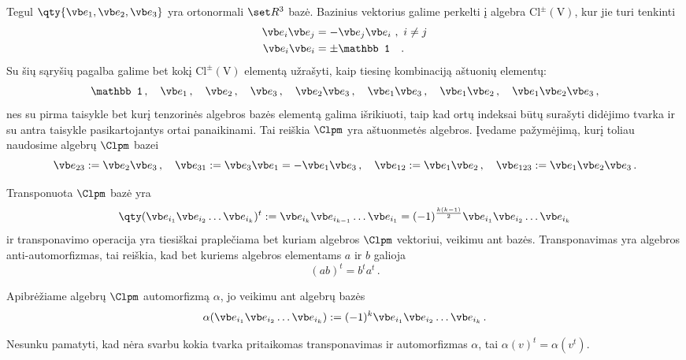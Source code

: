 Tegul $\qty{\vb e_1,\vb e_2,\vb e_3}$ yra ortonormali $\set R^3$ bazė.
Bazinius vektorius galime perkelti į algebra $\mathup{Cl^\pm(V)}$,
kur jie turi tenkinti
\begin{equation}
	\begin{split}
		\vb e_i \vb e_j &= - \vb e_j \vb e_i \ , \ i \neq j \\
		\vb e_i \vb e_i &= \pm \mathbb 1
		\quad .
	\end{split}
	\label{eq:base-relations}
\end{equation}
Su šių sąryšių pagalba galime bet kokį $\mathup{Cl^\pm(V)}$ elementą užrašyti,
kaip tiesinę kombinaciją aštuonių elementų:
\begin{equation}
	\mathbb 1 \,,\quad
	\vb e_1 \,,\quad 
	\vb e_2 \,,\quad  
	\vb e_3 \,,\quad  
	\vb e_2 \vb e_3 \,,\quad
	\vb e_1 \vb e_3 \,,\quad
	\vb e_1 \vb e_2 \,,\quad 
	\vb e_1 \vb e_2 \vb e_3 \,,
\end{equation}
nes su pirma taisykle bet kurį tenzorinės algebros bazės elementą galima išrikiuoti,
taip kad ortų indeksai būtų surašyti didėjimo tvarka
ir su antra taisykle pasikartojantys ortai panaikinami.
Tai reiškia $\Clpm$ yra aštuonmetės algebros.
Įvedame pažymėjimą, kurį toliau naudosime algebrų $\Clpm$ bazei
\begin{equation}
	\vb e_{23} := \vb e_2 \vb e_3
	\,,\quad
	\vb e_{31} := \vb e_3 \vb e_1 = -\vb e_1 \vb e_3 
	\,,\quad
	\vb e_{12} := \vb e_1 \vb e_2
	\,,\quad
	\vb e_{123} := \vb e_1 \vb e_2 \vb e_3
	\,.
\end{equation}

\begin{definition}
	Transponuota $\Clpm$ bazė yra 
	\begin{equation}
		\qty(\vb e_{i_1} \vb e_{i_2} \dots \vb e_{i_k} )^t
		:=
		\vb e_{i_k} \vb e_{i_{k-1}} \dots \vb e_{i_1}
		=
		(-1)^\frac{k(k-1)}{2} \vb e_{i_1} \vb e_{i_2} \dots \vb e_{i_k} 
	\end{equation}
	ir transponavimo operacija yra tiesiškai praplečiama
	bet kuriam algebros $\Clpm$ vektoriui, veikimu ant bazės.
	Transponavimas yra algebros anti-automorfizmas,
	tai reiškia, kad bet kuriems algebros elementams $a$ ir $b$ galioja
	\begin{equation}
		(a b)^t = b^t a^t
		\,.
	\end{equation}
\end{definition}
\begin{definition}
	Apibrėžiame algebrų $\Clpm$ automorfizmą $\alpha$, jo veikimu ant algebrų bazės
	\begin{equation}
		\alpha( \vb e_{i_1} \vb e_{i_2} \dots \vb e_{i_k} )
		:=
		(-1)^{k} \vb e_{i_1} \vb e_{i_2} \dots \vb e_{i_k} 
		\,.
	\end{equation}
\end{definition}
Nesunku pamatyti,
kad nėra svarbu kokia tvarka pritaikomas transponavimas ir automorfizmas $\alpha$,
tai $\alpha(v)^t = \alpha(v^t)$.


